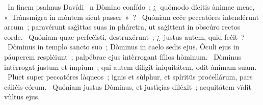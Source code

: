 {~In finem psalmus Davídi}
{%
~n Dòmino confído~; ¿~quómodo dícitis ànimae meae, «~Trànsmigra in mòntem sicut passer~»~?
~Quóniam ecċe peccatóres intendérunt arcum~; paravérunt saġìttas suas in pháretra, ut saġìttent in obscúro rectos corde.
~Quóniam quae perfeċìsti, destruxérunt~; ¿~justus autem, quid feċit~?
~Dòminus in templo sancto suo~; Dòminus in ċaelo sedis ejus. Òculi ejus in páuperem respìċiunt~; palpébrae ejus intèrrogant fílios hòminum.
~Dòminus intèrrogat justum et ìmpium~; qui autem díligit iniquitátem, odit ànimam suam.
~Pluet super peccatóres làqueos~; ìgnis et sùlphur, et spíritüs proċellárum, pars cáliċis eórum.
~Quóniam justus Dòminus, et justìçias diléxit~; aequitátem vïdit vùltus ejus.
}
